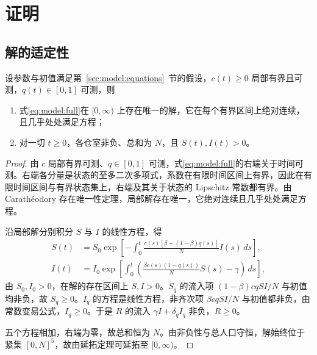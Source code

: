 \section{证明}
\label{sec:appendix:proofs}
\subsection{解的适定性}
\label{sec:proof:model-positive}
\begin{proposition}
\label{prop:model:positive}
设参数与初值满足第~\ref{sec:model:equations}~节的假设，$c(t)\ge0$ 局部有界且可测，$q(t)\in[0,1]$ 可测，则
\begin{enumerate}
\renewcommand{\labelenumi}{(\roman{enumi})}
\item 式\eqref{eq:model:full}在 $[0,\infty)$ 上存在唯一的解，它在每个有界区间上绝对连续，且几乎处处满足方程；
\item 对一切 $t\ge0$，各仓室非负、总和为 $N$，且 $S(t),I(t)>0$。
\end{enumerate}
\end{proposition}

\begin{proof}
由 $c$ 局部有界可测、$q\in[0,1]$ 可测，式\eqref{eq:model:full}的右端关于时间可测。右端各分量是状态的至多二次多项式，系数在有限时间区间上有界，因此在有限时间区间与有界状态集上，右端及其关于状态的 Lipschitz 常数都有界。由 Carathéodory 存在唯一性定理，局部解存在唯一，它绝对连续且几乎处处满足方程。

沿局部解分别积分 $S$ 与 $I$ 的线性方程，得
\begin{align*}
S(t)&=S_0\exp\!\left[-\int_0^t\frac{c(s)[\beta+(1-\beta)q(s)]}{N}I(s)\,ds\right],\\
I(t)&=I_0\exp\!\left[\int_0^t\left(\frac{\beta c(s)(1-q(s))}{N}S(s)-\gamma\right)\,ds\right],
\end{align*}
由 $S_0,I_0>0$，在解的存在区间上 $S,I>0$。$S_q$ 的流入项 $(1-\beta)cqSI/N$ 与初值均非负，故 $S_q\ge0$。$I_q$ 的方程是线性方程，非齐次项 $\beta cqSI/N$ 与初值都非负，由常数变易公式，$I_q\ge0$。于是 $R$ 的流入 $\gamma I+\delta_qI_q$ 非负，$R\ge0$。

五个方程相加，右端为零，故总和恒为 $N$。由非负性与总人口守恒，解始终位于紧集 $[0,N]^5$，故由延拓定理可延拓至 $[0,\infty)$。
\end{proof}

